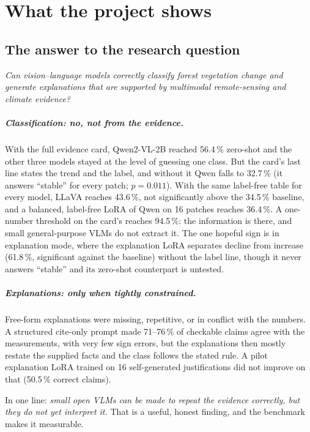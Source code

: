 \chapter{What the project shows}
\label{ch:meaning}

\section{The answer to the research question}

\emph{Can vision--language models correctly classify forest vegetation change and generate explanations that are supported by multimodal remote-sensing and climate evidence?}

\paragraph{Classification: no, not from the evidence.} With the full evidence card, Qwen2-VL-2B reached 56.4\,\% zero-shot and the other three models stayed at the level of guessing one class. But the card's last line states the trend and the label, and without it Qwen falls to 32.7\,\% (it answers ``stable'' for every patch; $p = 0.011$). With the same label-free table for every model, LLaVA reaches 43.6\,\%, not significantly above the 34.5\,\% baseline, and a balanced, label-free LoRA of Qwen on 16 patches reaches 36.4\,\%. A one-number threshold on the card's \dndvi{} reaches 94.5\,\%: the information is there, and small general-purpose VLMs do not extract it. The one hopeful sign is in explanation mode, where the explanation LoRA separates decline from increase (61.8\,\%, significant against the baseline) without the label line, though it never answers ``stable'' and its zero-shot counterpart is untested.

\paragraph{Explanations: only when tightly constrained.} Free-form explanations were missing, repetitive, or in conflict with the numbers. A structured cite-only prompt made 71--76\,\% of checkable claims agree with the measurements, with very few sign errors, but the explanations then mostly restate the supplied facts and the class follows the stated rule. A pilot explanation LoRA trained on 16 self-generated justifications did not improve on that (50.5\,\% correct claims).

\begin{plainwords}
In one line: \emph{small open VLMs can be made to repeat the evidence correctly, but they do not yet interpret it.} That is a useful, honest finding, and the benchmark makes it measurable.
\end{plainwords}

